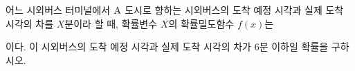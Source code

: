 어느 시외버스 터미널에서 $\mathrm{A}$ 도시로 향하는 시외버스의 도착 예정 시각과 실제 도착 시각의 차를 $X$분이라 할 때, 확률변수 $X$의 확률밀도함수 $f(x)$는 \par\smallskip{}\par\smallskip\noindent 이다. 이 시외버스의 도착 예정 시각과 실제 도착 시각의 차가 $6$분 이하일 확률을 구하시오.
